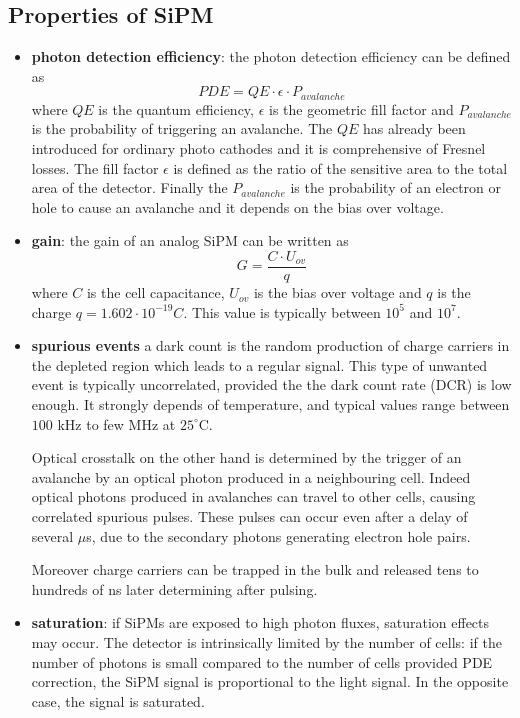 \subsection{Properties of SiPM}
\begin{itemize}
\item \textbf{photon detection efficiency}: the photon detection efficiency can be defined as
\begin{equation}
PDE = QE \cdot \epsilon \cdot P_{avalanche}
\end{equation}
where $QE$ is the quantum efficiency, $\epsilon$ is the geometric fill factor and $P_{avalanche}$ is the probability of triggering an avalanche.
The $QE$ has already been introduced for ordinary photo cathodes and it is comprehensive of Fresnel losses.
The fill factor $\epsilon$ is defined as the ratio of the sensitive area to the total area of the detector.
Finally the $P_{avalanche}$ is the probability of an electron or hole to cause an avalanche and it depends on the bias over voltage.

\item \textbf{gain}: the gain of an analog SiPM can be written as
\begin{equation}
G = \frac{C\cdot U_{ov}}{q}
\end{equation}
where $C$ is the cell capacitance, $U_{ov}$ is the bias over voltage and $q$ is the charge $q = 1.602 \cdot 10^{-19} C$.
This value is typically between $10^{5}$ and $10^{7}$.

\item \textbf{spurious events} a dark count is the random production of charge carriers in the depleted region which leads to a regular signal. This type of unwanted event is typically uncorrelated, provided the the dark count rate (DCR) is low enough. It strongly depends of temperature, and typical values range between $100$ kHz to few MHz at $25^{\circ}$C.

Optical crosstalk on the other hand is determined by the trigger of an avalanche by an optical photon produced in a neighbouring cell. Indeed optical photons produced in avalanches can travel to other cells, causing correlated spurious pulses. These pulses can occur even after a delay of several $\mu$s, due to the secondary photons generating electron hole pairs.

Moreover charge carriers can be trapped in the bulk and released tens to hundreds of ns later determining after pulsing.

\item \textbf{saturation}: if SiPMs are exposed to high photon fluxes, saturation effects may occur. The detector is intrinsically limited by the number of cells: if the number of photons is small compared to the number of cells provided PDE correction, the SiPM signal is proportional to the light signal. In the opposite case, the signal is saturated.
\end{itemize}

